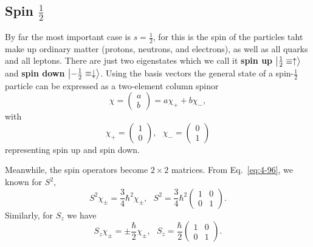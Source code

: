 \subsection{Spin $\frac{1}{2}$}
By far the most important case is $s= \frac{1}{2}$, for this is the spin of the particles taht make up ordinary matter (protons, neutrons, and electrons), as well as all quarks and all leptons.
There are just two eigenstates which we call it \textbf{spin up} $\ket{ \frac{1}{2} \equiv \uparrow}$ and \textbf{spin down} $\ket{ - \frac{1}{2} \equiv \downarrow}$.
Using the basis vectors the general state of a spin-$\frac{1}{2}$ particle can be expressed as a two-element column spinor
\begin{equation}
  \label{eq:4-99}
  \chi =
  \begin{pmatrix}
    a \\
    b
  \end{pmatrix}
  =a \chi_+ + b \chi_-,
\end{equation}
with
\begin{equation}
  \label{eq:4-100}
  \chi_+ =
  \begin{pmatrix}
    1\\
    0
  \end{pmatrix}, ~ ~ ~
  \chi_- =
  \begin{pmatrix}
    0\\
    1
  \end{pmatrix}
\end{equation}
representing spin up and spin down.

Meanwhile, the spin operators become $2\times 2$ matrices.
From Eq.~\eqref{eq:4-96}, we known for $S^2$,
\begin{equation}
  \label{eq:4-101}
  S^2 \chi_{\pm}= \frac{3}{4} \hbar^2 \chi_{\pm}, ~ ~ ~
  S^2 = \frac{3}{4} \hbar^2
  \begin{pmatrix}
    1 & 0 \\
    0 & 1
  \end{pmatrix}.
\end{equation}
Similarly, for $S_z$ we have
\begin{equation}
  \label{eq:4-102}
  S_z \chi_{\pm} = \pm \frac{\hbar}{2} \chi_{\pm}, ~ ~ ~
  S_z = \frac{\hbar}{2}
  \begin{pmatrix}
    1 & 0 \\
    0 & 1
  \end{pmatrix}.
\end{equation}

